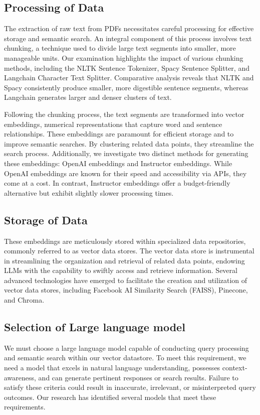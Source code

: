 \documentclass[conference]{IEEEtran}
\begin{document}
\subsection{Processing of Data}

The extraction of raw text from PDFs necessitates careful processing for effective storage and semantic search. An integral component of this process involves text chunking, a technique used to divide large text segments into smaller, more manageable units. Our examination highlights the impact of various chunking methods, including the NLTK Sentence Tokenizer, Spacy Sentence Splitter, and Langchain Character Text Splitter. Comparative analysis reveals that NLTK and Spacy consistently produce smaller, more digestible sentence segments, whereas Langchain generates larger and denser clusters of text.

Following the chunking process, the text segments are transformed into vector embeddings, numerical representations that capture word and sentence relationships. These embeddings are paramount for efficient storage and to improve semantic searches. By clustering related data points, they streamline the search process. Additionally, we investigate two distinct methods for generating these embeddings: OpenAI embeddings and Instructor embeddings. While OpenAI embeddings are known for their speed and accessibility via APIs, they come at a cost. In contrast, Instructor embeddings offer a budget-friendly alternative but exhibit slightly slower processing times.

\subsection{Storage of Data}

These embeddings are meticulously stored within specialized data repositories, commonly referred to as vector data stores. The vector data store is instrumental in streamlining the organization and retrieval of related data points, endowing LLMs with the capability to swiftly access and retrieve information. Several advanced technologies have emerged to facilitate the creation and utilization of vector data stores, including Facebook AI Similarity Search (FAISS), Pinecone, and Chroma. 

\subsection{Selection of Large language model}
We must choose a large language model capable of conducting query processing and semantic search within our vector datastore. To meet this requirement, we need a model that excels in natural language understanding, possesses context-awareness, and can generate pertinent responses or search results. Failure to satisfy these criteria could result in inaccurate, irrelevant, or misinterpreted query outcomes. Our research has identified several models that meet these requirements.
\end{document}
